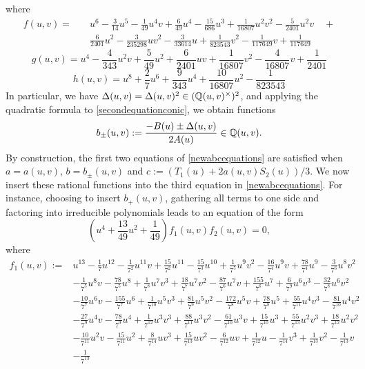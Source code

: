 where 
\[
\begin{split}
    f(u,v) =& \quad u^6 - \frac{3}{14}u^5 - \frac{1}{49}u^4v + \frac{6}{49}u^4 - \frac{15}{686}u^3 + \frac{1}{16807}u^2v^2 - \frac{5}{2401}u^2v \quad +\\
    &\quad \frac{6}{2401}u^2 - \frac{3}{235298}uv^2 - \frac{3}{33614}u + \frac{1}{823543}v^2 - \frac{1}{117649}v + \frac{1}{117649} 
\end{split}
\]
\[
g(u,v) =   u^4 - \frac{4}{343}u^2v + \frac{5}{49}u^2 + \frac{6}{2401}uv + \frac{1}{16807}v^2 - \frac{4}{16807}v + \frac{1}{2401} 
\]
\[
h(u,v) = u^8 + \frac{2}{7}u^6 + \frac{9}{343}u^4 + \frac{10}{16807}u^2 - \frac{1}{823543}
\]
In particular, we have $\Delta(u,v) = \Delta(u,v)^2 \in (\mathbb{Q}(u,v)^\times)^2$, and applying the quadratic formula to \eqref{secondequationconic}, we obtain functions
\[
b_{\pm}(u,v) := \frac{-B(u) \pm \Delta(u,v)}{2A(u)} \in \mathbb{Q}(u,v).
\]
By construction, the first two equations of \eqref{newabcequations} are satisfied when $a = a(u,v)$, $b = b_{\pm}(u,v)$ and $c := (T_1(u) + 2a(u,v)S_2(u))/3$. We now insert these rational functions into the third equation in \eqref{newabcequations}. For instance, choosing to insert $b_{+}(u,v)$, gathering all terms to one side and factoring into irreducible polynomials leads to an equation of the form
\begin{equation} \label{expressioninu}
\left( u^4 + \frac{13}{49}u^2 + \frac{1}{49} \right) f_1(u,v) f_2(u,v) = 0,
\end{equation}
where
\[
\begin{split}
f_1(u,v) := &u^{13} - \frac{1}{7}u^{12} - \frac{1}{7^2}u^{11}v + \frac{15}{7^2}u^{11} - \frac{15}{7^3}u^{10} + \frac{1}{7^5}u^9v^2 - \frac{16}{7^4}u^9v + \frac{78}{7^4}u^9 - \frac{3}{7^6}u^8v^2 \\
&- \frac{1}{7^5}u^8v - \frac{78}{7^5}u^8 + \frac{1}{7^8}u^7v^3 + \frac{18}{7^7}u^7v^2 - \frac{87}{7^6}u^7v + \frac{155}{7^6}u^7 + \frac{6}{7^9}u^6v^3 - \frac{32}{7^8}u^6v^2 \\ 
 &- \frac{10}{7^7}u^6v - \frac{155}{7^7}u^6 + \frac{1}{7^{10}}u^5v^3 + 
 \frac{81}{7^9}u^5v^2 - \frac{172}{7^8}u^5v + \frac{78}{7^8}u^5 + \frac{55}{7^{11}}u^4v^3 - \frac{81}{7^{10}}u^4v^2\\ 
 &-\frac{27}{7^9}u^4v - \frac{78}{7^9}u^4 + \frac{1}{7^{12}}u^3v^3 + \frac{88}{7^{11}}u^3v^2 - \frac{61}{7^{10}}u^3v + \frac{15}{7^{10}}u^3 + \frac{55}{7^{13}}u^2v^3 + \frac{18}{7^{12}}u^2v^2\\
 &- \frac{10}{7^{11}}u^2v - \frac{15}{7^{11}}u^2 + \frac{8}{7^{14}}uv^3 + \frac{15}{7^{13}}uv^2 - \frac{6}{7^{12}}uv + \frac{1}{7^{12}}u - \frac{1}{7^{14}}v^3 + \frac{1}{7^{13}}v^2 - 
 \frac{1}{7^{13}}v \\
 &- \frac{1}{7^{13}}
\end{split}
\]
